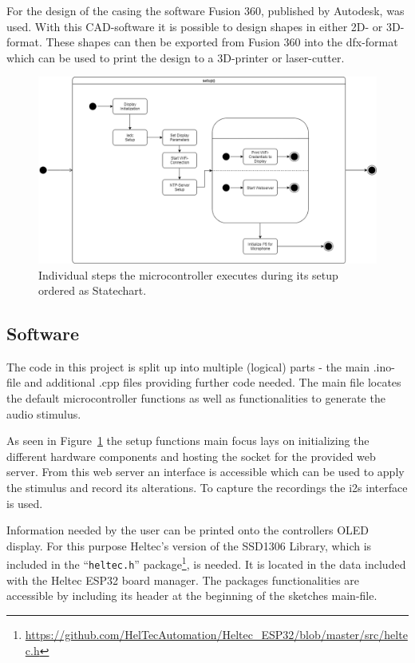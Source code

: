 For the design of the casing the software Fusion 360, published by Autodesk, was used.
With this CAD-software it is possible to design shapes in either 2D- or 3D-format.
These shapes can then be exported from Fusion 360 into the dfx-format which can be used to print the design to a 3D-printer or laser-cutter.

\begin{figure}[H]
	\includegraphics[width=\linewidth]{Media/Controller_setup.png}
	\caption{Individual steps the microcontroller executes during its setup ordered as Statechart.}
	\label{fig:cntrlr_stp}
\end{figure}

\subsection{Software}
The code in this project is split up into multiple (logical) parts - the main .ino-file and additional .cpp files providing further code needed.
The main file locates the default microcontroller functions as well as functionalities to generate the audio stimulus.

As seen in Figure~\ref{fig:cntrlr_stp} the setup functions main focus lays on initializing the different hardware components and hosting the socket for the provided web server.
From this web server an interface is accessible which can be used to apply the stimulus and record its alterations.
To capture the recordings the i2s interface is used.

Information needed by the user can be printed onto the controllers OLED display.
For this purpose Heltec's version of the SSD1306 Library, which is included in the \enquote{\texttt{heltec.h}} package\footnote{\url{https://github.com/HelTecAutomation/Heltec_ESP32/blob/master/src/heltec.h}}, is needed.
It is located in the data included with the Heltec ESP32 board manager.
The packages functionalities are accessible by including its header at the beginning of the sketches main-file.

